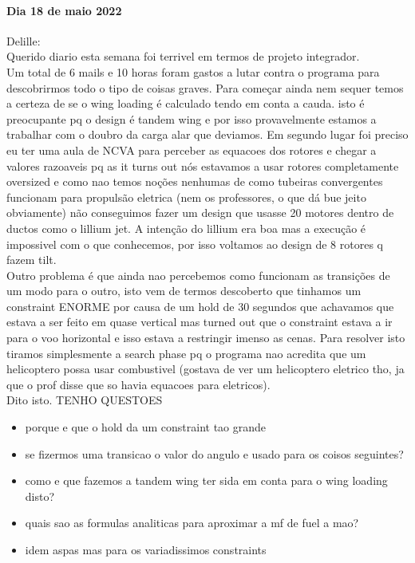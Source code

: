 \paragraph{Dia 18 de maio 2022}
Delille:\\
Querido diario esta semana foi terrivel em termos de projeto integrador.\\
Um total de 6 mails e 10 horas foram gastos a lutar contra o programa para descobrirmos todo o tipo de coisas graves. Para começar ainda nem sequer temos a certeza de se o wing loading é calculado tendo em conta a cauda. isto é preocupante pq o design é tandem wing e por isso provavelmente estamos a trabalhar com o doubro da carga alar que deviamos. Em segundo lugar foi preciso eu ter uma aula de NCVA para perceber as equacoes dos rotores e chegar a valores razoaveis pq as it turns out nós estavamos a usar rotores completamente oversized e como nao temos noções nenhumas de como tubeiras convergentes funcionam para propulsão eletrica (nem os professores, o que dá bue jeito obviamente) não conseguimos fazer um design que usasse 20 motores dentro de ductos como o lillium jet. A intenção do lillium era boa mas a execução é impossivel com o que conhecemos, por isso voltamos ao design de 8 rotores q fazem tilt.\\

Outro problema é que ainda nao percebemos como funcionam as transições de um modo para o outro, isto vem de termos descoberto que tinhamos um constraint ENORME por causa de um hold de 30 segundos que achavamos que estava a ser feito em quase vertical mas turned out que o constraint estava a ir para o voo horizontal e isso estava a restringir imenso as cenas. Para resolver isto tiramos simplesmente a search phase pq o programa nao acredita que um helicoptero possa usar combustivel (gostava de ver um helicoptero eletrico tho, ja que o prof disse que so havia equacoes para eletricos).\\

Dito isto. TENHO QUESTOES
\begin{itemize}
    \item porque e que o hold da um constraint tao grande
    \item se fizermos uma transicao o valor do angulo e usado para os coisos seguintes?
    \item como e que fazemos a tandem wing ter sida em conta para o wing loading disto?
    \item quais sao as formulas analiticas para aproximar a mf de fuel a mao?
    \item idem aspas mas para os variadissimos constraints
    
\end{itemize}